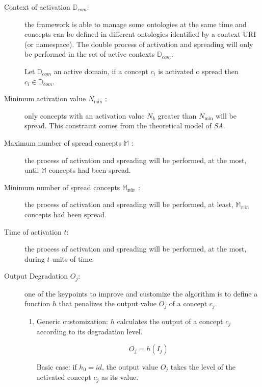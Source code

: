 \begin{description}

\item[Context of activation $\mathbb{D}_{com}$:] the framework is able to manage some ontologies
at the same time and concepts can be defined in different ontologies identified
by a context URI (or namespace). The double process of activation and spreading will only be performed in the
set of active contexts $\mathbb{D}_{com}$.


\begin{definition}
Let $\mathbb{D}_{com}$ an active domain, if a concept $c_i$ is activated o
spread then $c_{i} \in \mathbb{D}_{com}$.
\end{definition}

\item[Minimum activation value $N_{\min}$ :] only concepts with an activation
value $N_k$ greater than $N_{\min}$ will be spread. This constraint comes from
the theoretical model of \textit{SA}.

\item[Maximum number of spread concepts $\mathbb{M}$ :] the process of
activation and spreading will be performed, at the most, until $\mathbb{M}$ concepts
had been spread.

\item[Minimum number of spread concepts $\mathbb{M_{\min}}$ :] the process of
activation and spreading will be performed, at least, $\mathbb{M_{\min}}$ concepts had
been spread.

\item[Time of activation $t$:] the process of activation and spreading
will be performed, at the most, during $t$ units of time.

\item[Output Degradation $O_j$:] one of the keypoints to improve and customize
the algorithm is to define a function $h$ that penalizes the output value $O_j$
of a concept $c_j$.

\begin{enumerate}

\item Generic customization: $h$ calculates the output of a concept $c_j$
according to its degradation level.

\begin{equation}
O_j = h(I_j)
\end{equation}

Basic case: if $h_0 = id$, the output value $O_j$ takes the level of the
activated concept $c_j$ as its value.


\end{enumerate}
\end{description}
